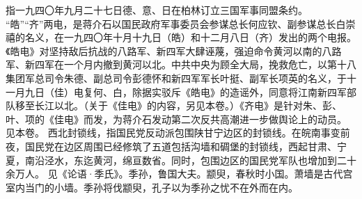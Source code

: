 \begin{maonote}
指一九四〇年九月二十七日德、意、日在柏林订立三国军事同盟条约。
“皓”“齐”两电，是蒋介石以国民政府军事委员会参谋总长何应钦、副参谋总长白崇禧的名义，在一九四〇年十月十九日（皓）和十二月八日（齐）发出的两个电报。《皓电》对坚持敌后抗战的八路军、新四军大肆诬蔑，强迫命令黄河以南的八路军、新四军在一个月内撤到黄河以北。中共中央为顾全大局，挽救危亡，以第十八集团军总司令朱德、副总司令彭德怀和新四军军长叶挺、副军长项英的名义，于十一月九日（佳）电复何、白，除据实驳斥《皓电》的造谣外，同意将江南新四军部队移至长江以北。（关于《佳电》的内容，另见本卷。）《齐电》是针对朱、彭、叶、项的《佳电》而发，为蒋介石发动第二次反共高潮进一步做舆论上的动员。
见本卷。
西北封锁线，指国民党反动派包围陕甘宁边区的封锁线。在皖南事变前夜，国民党在边区周围已经修筑了五道包括沟墙和碉堡的封锁线，西起甘肃、宁夏，南沿泾水，东迄黄河，绵亘数省。同时，包围边区的国民党军队也增加到二十余万人。
见《论语·季氏》。季孙，鲁国大夫。颛臾，春秋时小国。萧墙是古代宫室内当门的小墙。季孙将伐颛臾，孔子以为季孙之忧不在外而在内。
\end{maonote}

